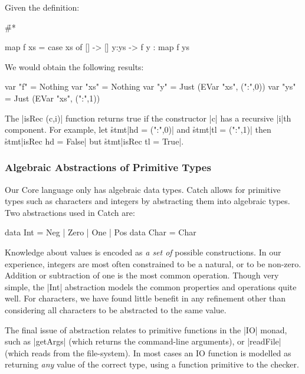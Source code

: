 \begin{example}
Given the definition:

\h{#*}\begin{code}
map f xs = case  xs of
                 []    -> []
                 y:ys  -> f y : map f ys
\end{code}

We would obtain the following results:

\begin{code}
var "f"   = Nothing
var "xs"  = Nothing
var "y"   = Just (EVar "xs", (":",0))
var "ys"  = Just (EVar "xs", (":",1))
\end{code}
\end{example}

The |isRec (c,i)| function returns true if the constructor |c| has a recursive |i|th component. For example, let \h{stmt}|hd = (":",0)| and \h{stmt}|tl = (":",1)| then \h{stmt}|isRec hd = False| but \h{stmt}|isRec tl = True|.

\subsubsection{Algebraic Abstractions of Primitive Types}
\label{secC:abstraction}

Our Core language only has algebraic data types. Catch allows for primitive types such as characters and integers by abstracting them into algebraic types. Two abstractions used in Catch are:

\ignore\begin{code}
data Int = Neg | Zero | One | Pos
data Char = Char
\end{code}

Knowledge about values is encoded as \textit{a set of} possible constructions. In our experience, integers are most often constrained to be a natural, or to be non-zero. Addition or subtraction of one is the most common operation. Though very simple, the |Int| abstraction models the common properties and operations quite well. For characters, we have found little benefit in any refinement other than considering all characters to be abstracted to the same value.

The final issue of abstraction relates to primitive functions in the |IO| monad, such as |getArgs| (which returns the command-line arguments), or |readFile| (which reads from the file-system). In most cases an IO function is modelled as returning \textit{any} value of the correct type, using a function primitive to the checker.

